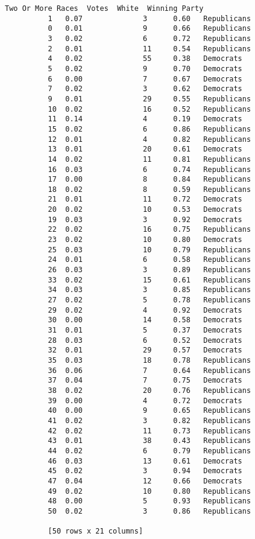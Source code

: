 \documentclass[11pt]{article}
\begin{document}
\begin{Verbatim}[commandchars=\\\{\}]
             Two Or More Races  Votes  White  Winning Party  
          1   0.07              3      0.60   Republicans    
          0   0.01              9      0.66   Republicans    
          3   0.02              6      0.72   Republicans    
          2   0.01              11     0.54   Republicans    
          4   0.02              55     0.38   Democrats      
          5   0.02              9      0.70   Democrats      
          6   0.00              7      0.67   Democrats      
          7   0.02              3      0.62   Democrats      
          9   0.01              29     0.55   Republicans    
          10  0.02              16     0.52   Republicans    
          11  0.14              4      0.19   Democrats      
          15  0.02              6      0.86   Republicans    
          12  0.01              4      0.82   Republicans    
          13  0.01              20     0.61   Democrats      
          14  0.02              11     0.81   Republicans    
          16  0.03              6      0.74   Republicans    
          17  0.00              8      0.84   Republicans    
          18  0.02              8      0.59   Republicans    
          21  0.01              11     0.72   Democrats      
          20  0.02              10     0.53   Democrats      
          19  0.03              3      0.92   Democrats      
          22  0.02              16     0.75   Republicans    
          23  0.02              10     0.80   Democrats      
          25  0.03              10     0.79   Republicans    
          24  0.01              6      0.58   Republicans    
          26  0.03              3      0.89   Republicans    
          33  0.02              15     0.61   Republicans    
          34  0.03              3      0.85   Republicans    
          27  0.02              5      0.78   Republicans    
          29  0.02              4      0.92   Democrats      
          30  0.00              14     0.58   Democrats      
          31  0.01              5      0.37   Democrats      
          28  0.03              6      0.52   Democrats      
          32  0.01              29     0.57   Democrats      
          35  0.03              18     0.78   Republicans    
          36  0.06              7      0.64   Republicans    
          37  0.04              7      0.75   Democrats      
          38  0.02              20     0.76   Republicans    
          39  0.00              4      0.72   Democrats      
          40  0.00              9      0.65   Republicans    
          41  0.02              3      0.82   Republicans    
          42  0.02              11     0.73   Republicans    
          43  0.01              38     0.43   Republicans    
          44  0.02              6      0.79   Republicans    
          46  0.03              13     0.61   Democrats      
          45  0.02              3      0.94   Democrats      
          47  0.04              12     0.66   Democrats      
          49  0.02              10     0.80   Republicans    
          48  0.00              5      0.93   Republicans    
          50  0.02              3      0.86   Republicans    
          
          [50 rows x 21 columns]
\end{Verbatim}
            
\end{document}
